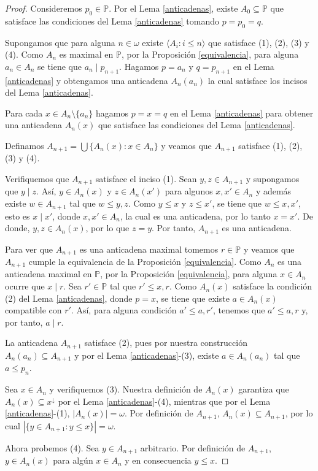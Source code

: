 \documentclass[11pt]{unam_tesis1}
\theoremstyle{MyThmStyle}
\theoremstyle{definition}
\theoremstyle{plain}
\theoremstyle{remark}
\let\leq\leqslant
\begin{document}
\begin{proof}
Consideremos $p_0\in \mathbb P$. Por el Lema \ref{anticadenas}, existe $A_0\subseteq \mathbb P$ que satisface las condiciones del Lema \ref{anticadenas} tomando $p=p_0=q$.

Supongamos que para alguna $n\in \omega$ existe $\langle A_i:i\leq n \rangle$ que satisface (1), (2), (3) y (4). Como $A_n$ es maximal en $\mathbb P$, por la Proposici\'on \ref{equivalencia}, para alguna  $a_n\in A_n$ se tiene que $a_n\mid p_{n+1}$. Hagamos $p=a_n$ y $q=p_{n+1}$ en el Lema \ref{anticadenas} y obtengamos una anticadena $A_n(a_n)$ la cual satisface los incisos del Lema \ref{anticadenas}. 

Para cada $x\in A_n\setminus \{a_n\}$ hagamos $p=x=q$ en el Lema \ref{anticadenas} para obtener una anticadena $A_n(x)$ que satisface las condiciones del Lema \ref{anticadenas}.

Definamos $A_{n+1}=\bigcup \{A_n(x):x\in A_n\}$ y veamos que $A_{n+1}$ satisface (1), (2), (3) y (4).

Verifiquemos que $A_{n+1}$ satisface el inciso (1). Sean $y, z\in A_{n+1}$ y supongamos que $y\mid z$. As\'i, $y\in A_n(x)$ y $z\in A_n(x')$ para algunos $x,x'\in A_n$ y adem\'as existe $w\in A_{n+1}$ tal que $w\leq y,z$. Como $y\leq x$ y $z\leq x'$, se tiene que $w\leq x,x'$, esto es $x\mid x'$, donde $x,x'\in A_n$, la cual es una anticadena, por lo tanto $x=x'$. De donde, $y,z\in A_n(x)$, por lo que $z=y$. Por tanto, $A_{n+1}$ es una anticadena.

Para ver que $A_{n+1}$ es una anticadena maximal tomemos $r\in \mathbb P$ y veamos que $A_{n+1}$ cumple la equivalencia de la Proposici\'on \ref{equivalencia}. Como $A_n$ es una anticadena maximal en $\mathbb P$, por la Proposici\'on \ref{equivalencia}, para alguna $x\in A_n$ ocurre que $x\mid r$. Sea $r'\in \mathbb P$ tal que $r'\leq x,r$. Como $A_n(x)$ satisface la condici\'on (2) del Lema \ref{anticadenas}, donde $p=x$, se tiene que existe $a\in A_n(x)$ compatible con $r'$. As\'i, para alguna condici\'on $a'\leq a,r'$, tenemos que $a'\leq a,r$ y, por tanto, $a\mid r$.

La anticadena $A_{n+1}$ satisface (2), pues por nuestra construcci\'on $A_n(a_n)\subseteq A_{n+1}$ y por el Lema \ref{anticadenas}-(3), existe $a\in A_n(a_n)$ tal que $a\leq p_{n}$.

Sea $x\in A_n$ y verifiquemos (3). Nuestra definici\'on de $A_n(x)$ garantiza que $A_n(x)\subseteq x^{\downarrow}$ por el Lema \ref{anticadenas}-(4), mientras que por el Lema \ref{anticadenas}-(1), $|A_n(x)|=\omega$. Por definici\'on de $A_{n+1}$, $A_n(x)\subseteq A_{n+1}$, por lo cual $| \{y\in A_{n+1}:y\leq x\}|=\omega$.

Ahora probemos (4). Sea $y\in A_{n+1}$ arbitrario. Por definici\'on de $A_{n+1}$, $y\in A_n(x)$ para alg\'un $x\in A_n$ y en consecuencia $y\leq x$.
\end{proof}
\end{document}
